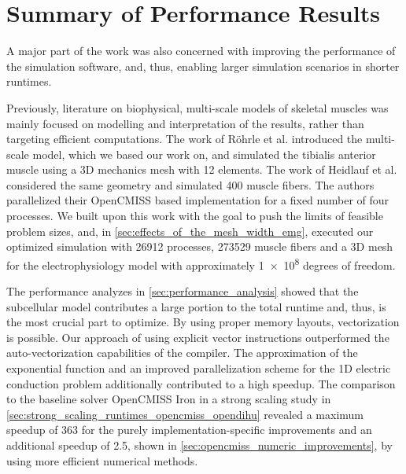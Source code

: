 
\section{Summary of Performance Results}\label{sec:observations_performance}

A major part of the work was also concerned with improving the performance of the simulation software, and, thus, enabling larger simulation scenarios in shorter runtimes.

Previously, literature on biophysical, multi-scale models of skeletal muscles was mainly focused on modelling and interpretation of the results, rather than targeting efficient computations. The work of Röhrle et al. \cite{Roehrle2012} introduced the multi-scale model, which we based our work on, and simulated the tibialis anterior muscle using a 3D mechanics mesh with 12 elements. The work of Heidlauf et al. \cite{Heidlauf2013} considered the same geometry and simulated 400 muscle fibers. The authors parallelized their OpenCMISS based implementation for a fixed number of four processes. We built upon this work with the goal to push the limits of feasible problem sizes, and, in \cref{sec:effects_of_the_mesh_width_emg}, executed our optimized simulation with \num{26912} processes, \num{273529} muscle fibers and a 3D mesh for the electrophysiology model with approximately \num{1e8} degrees of freedom.

The performance analyzes in \cref{sec:performance_analysis} showed that the subcellular model contributes a large portion to the total runtime and, thus, is the most crucial part to optimize. By using proper memory layouts, vectorization is possible. Our approach of using explicit vector instructions outperformed the auto-vectorization capabilities of the compiler. The approximation of the exponential function and an improved parallelization scheme for the 1D electric conduction problem additionally contributed to a high speedup. The comparison to the baseline solver OpenCMISS Iron in a strong scaling study in \cref{sec:strong_scaling_runtimes_opencmiss_opendihu} revealed a maximum speedup of 363 for the purely implementation-specific improvements and an additional speedup of 2.5, shown in \cref{sec:opencmiss_numeric_improvements}, by using more efficient numerical methods.

